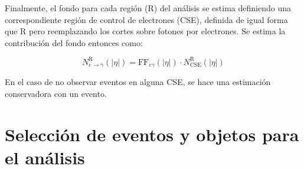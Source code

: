 \begin{table}
\centering
\caption{Factores de reconstrucción errónea de electrones como fotones en función de $|\eta|$ para todos los datos del Run 2. Se ponen explícitas las incertidumbres estadísticas y sistemáticas provenientes de variar la ventana de integración, no emplear la sustracción de fondo y el sesgo en la energía de los fotones.}
\label{tab:efakes_ff}
\end{table}


Finalmente, el fondo para cada región (R) del análisis se estima definiendo una correspondiente región de control de electrones (CSE), definida de igual forma que R pero reemplazando los cortes sobre fotones por electrones. Se estima la contribución del fondo entonces como:

\begin{equation}
  N^{\text{R}}_{e\rightarrow\gamma}(|\eta|) = \text{FF}_{e\gamma}(|\eta|)\cdot N^{\text{R}}_{\mathrm{CSE}}(|\eta|)
  \label{eq:efake_cs}
\end{equation}

En el caso de no observar eventos en alguna CSE, se hace una estimación conservadora con un evento.



\section{Selección de eventos y objetos para el análisis}\label{sec:selection}

